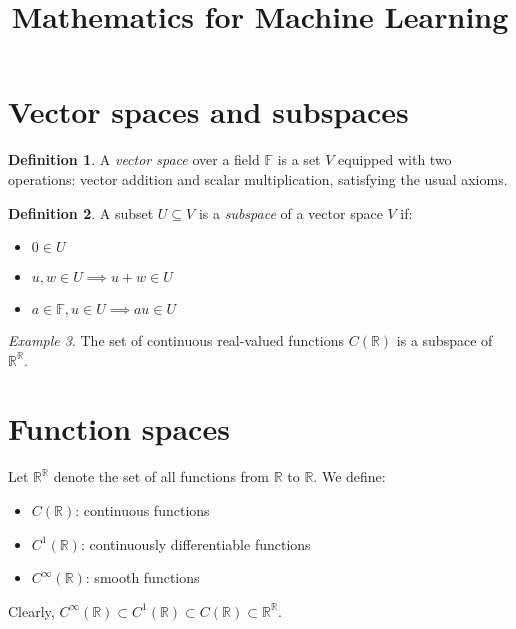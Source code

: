 \documentclass[11pt]{article}
\title{Mathematics for Machine Learning}
\author{}
\date{}
\newcommand{\F}{\mathbb{F}}
\newcommand{\R}{\mathbb{R}}
\theoremstyle{definition}
\newtheorem{definition}{Definition}[section]
\theoremstyle{plain}
\theoremstyle{remark}
\newtheorem{example}[definition]{Example}
\begin{document}
\maketitle
\tableofcontents
\vspace{1em}

\section{Vector spaces and subspaces}

\begin{definition}
    A \emph{vector space} over a field \( \F \) is a set \( V \) equipped with two operations: vector addition and
    scalar multiplication, satisfying the usual axioms.
\end{definition}

\begin{definition}
    A subset \( U \subseteq V \) is a \emph{subspace} of a vector space \( V \) if:
    \begin{itemize}
        \item \( 0 \in U \)
        \item \( u, w \in U \implies u + w \in U \)
        \item \( a \in \F, u \in U \implies a u \in U \)
    \end{itemize}
\end{definition}

\begin{example}
    The set of continuous real-valued functions \( C(\R) \) is a subspace of \( \R^\R \).
\end{example}

\section{Function spaces}

Let \( \R^\R \) denote the set of all functions from \( \R \) to \( \R \). We define:

\begin{itemize}
    \item \( C(\R) \): continuous functions
    \item \( C^1(\R) \): continuously differentiable functions
    \item \( C^\infty(\R) \): smooth functions
\end{itemize}

Clearly, \( C^\infty(\R) \subset C^1(\R) \subset C(\R) \subset \R^\R \).
\end{document}
